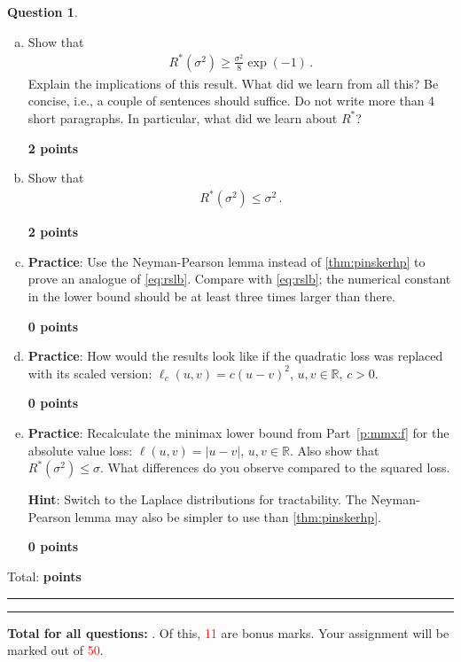\documentclass{article}
\newcommand{\R}{\mathbb{R}}
\DeclareMathOperator*{\1}{\mathbbm{1}}
\newcounter{DocPoints}
\newcounter{QuestionPoints}
\newcommand{\points}[1]{	\par\mbox{}\par\noindent\hfill {\bf #1 points}	\addtocounter{DocPoints}{#1}
	\addtocounter{QuestionPoints}{#1}
}
\newcommand{\tpoints}[1]{        	\ifthenelse{\isempty{#1}}	{	}	{		\addtocounter{DocPoints}{#1}
		\addtocounter{QuestionPoints}{#1}
	}													 	\par\mbox{}\par\noindent\hfill {Total: \bf \arabic{QuestionPoints}\xspace points}\par\mbox{}\par\hrule\hrule
	\setcounter{QuestionPoints}{0}
}
\theoremstyle{definition}
\newtheorem{question}{Question}
\theoremstyle{remark}
\newcommand{\hint}{\noindent \textbf{Hint}:\xspace}
\begin{document}
\begin{question}
\begin{enumerate}[(a)]
\hint Use \cref{thm:pinskerhp}. 
While the previous part is not immediately applicable, it may give you some ideas of how to 
lower bound the maximum loss by the sum (or maximum) of ``failure probabilities''
(the logic is that if the data is from $P_1$, the loss is large when the prediction is in some well-chosen set $A$, while if the data is from $P_2$, the loss is large when the prediction is in the complement of $A$).
Also, recall that for $a,b$ reals, $\max(a,b) \ge (a+b)/2$.

\item \label{p:mmx:f} Show that 
\begin{align}
R^*(\sigma^2) \ge \frac{\sigma^2}{8} \exp(-1)\,. \label{eq:rslb}
\end{align}
Explain the implications of this result. What did we learn from all this? Be concise, i.e., a couple of sentences should suffice. Do not write more than 4 short paragraphs. In particular, what did we learn about $R^*$?

\points{2}

\item 
Show that 
\begin{align*}
R^*(\sigma^2)  \le \sigma^2\,.
\end{align*}

\points{2}

\item \label{p:nplemma}
 \textbf{Practice}: Use the Neyman-Pearson lemma instead of \cref{thm:pinskerhp}
to prove an analogue of \cref{eq:rslb}.
Compare with \cref{eq:rslb}; the numerical constant in the lower bound should be at least three times larger than there.

\points{0}

\item \textbf{Practice}: 
How would the results look like if the quadratic loss was replaced with its scaled version:
$\ell_c(u,v) = c (u-v)^2$, $u,v\in \R$, $c>0$. 

\points{0}

\item \textbf{Practice}: Recalculate the minimax lower bound 
from Part~\eqref{p:mmx:f} for the
absolute value loss: $\ell(u,v) = |u-v|$, $u,v\in \R$.
Also show that $R^*(\sigma^2) \le \sigma$.
What differences do you observe compared to the squared loss.

\hint Switch to the Laplace distributions for tractability. The Neyman-Pearson lemma may also be simpler to use than \cref{thm:pinskerhp}.
\points{0}

\end{enumerate}
 
\tpoints{}
\end{question}





\bigskip
\bigskip

\noindent
\textbf{
Total for all questions: }.
Of this, \textcolor{red}{11} are bonus marks. 
Your assignment will be marked out of \textcolor{red}{50}.
\end{document}
